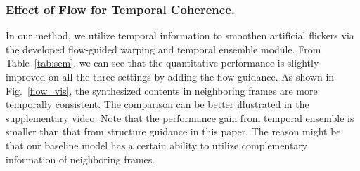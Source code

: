 \subsubsection{Effect of Flow for Temporal Coherence.}

In our method, we utilize temporal information to smoothen artificial flickers via the developed flow-guided warping and temporal ensemble module. 
From Table~\ref{tab:sem}, we can see that the quantitative performance is slightly improved on all the three settings by adding the flow guidance. 
As shown in Fig.~\ref{flow_vis}, the synthesized contents in neighboring frames are more temporally consistent.
The comparison can be better illustrated in the supplementary video.
Note that the performance gain from temporal ensemble is smaller than that from structure guidance in this paper.
The reason might be that our baseline model has a certain ability to utilize complementary information of neighboring frames.

 














 

